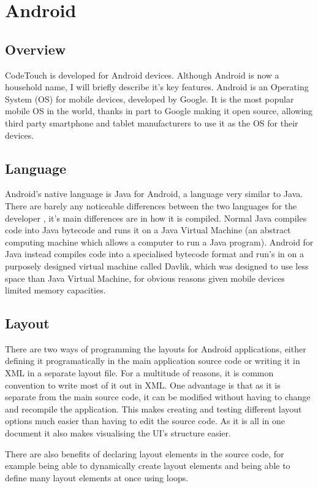 \documentclass[ %
                    author={Jonathan Rankin},
                supervisor={Dr. David May, Dr. Ian Holyer},
                    degree={MEng},
                     title={CodeTouch},
                  subtitle={A Revolutionary Way To Program Real Code On Touch Screen Devices},
                      type={enterprise},
                      year={2015 } ]{dissertation}
\begin{document}
\section{Android}
\subsection{Overview}
CodeTouch is developed for Android devices. Although Android is now a household name, I will briefly describe it's key features. Android is an Operating System (OS) for mobile devices, developed by Google. It is the most popular mobile OS in the world, thanks in part to Google making it open source, allowing third party smartphone and tablet manufacturers to use it as the OS for their devices. 

\subsection{Language}
Android's native language is Java for Android, a language very similar to Java. There are barely any noticeable differences between the two languages for the developer , it's main differences are in how it is compiled. Normal Java compiles code into Java bytecode and runs it on a Java Virtual Machine (an abstract computing machine which allows a computer to run a Java program). Android for Java instead compiles code into a specialised bytecode format and run's in on a purposely designed virtual machine called Davlik, which was designed to use less space than Java Virtual Machine, for obvious reasons given mobile devices limited memory capacities. 

\subsection{Layout}
There are two ways of programming the layouts for Android applications, either defining it programatically in the main application source code or writing it in XML in a separate layout file. For a multitude of reasons, it is common convention to write most of it out in XML. One advantage is that as it is separate from the main source code, it can be modified without having to change and recompile the application. This makes creating and testing different layout options much easier than having to edit the source code. As it is all in one document it also makes visualising the UI's structure easier. 


There are also benefits of declaring layout elements in the source code, for example being able to dynamically create layout elements and being able to define many layout elements at once using loops.
\end{document}
